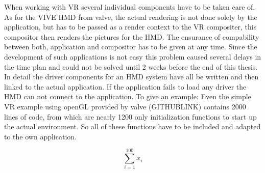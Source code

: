 \documentclass[hyperref,english,bachelorofscience,bibnum]{cgvpub}
\begin{document}
When working with VR several individual components have to be taken care of. As for the VIVE HMD from valve, the actual rendering is not done solely by the application, but has to be passed as a render context to the VR compositer, this compositor then renders the pictures for the HMD. The ensurance of compability between both, application and compositor has to be given at any time. Since the development of such applications is not easy this problem caused several delays in the time plan and could not be solved until 2 weeks before the end of this thesis. In detail the driver components for an HMD system have all be written and then linked to the actual application. If the application fails to load any driver the HMD can not connect to the application. To give an example: Even the simple VR example using openGL provided by valve (GITHUBLINK) contains 2000 lines of code, from which are nearly 1200 only initialization functions to start up the actual environment. So all of these functions have to be included and adapted to the own application.




\[
\sum_{i=1}^{100}x_i
\]


\cite*{}
\end{document}

